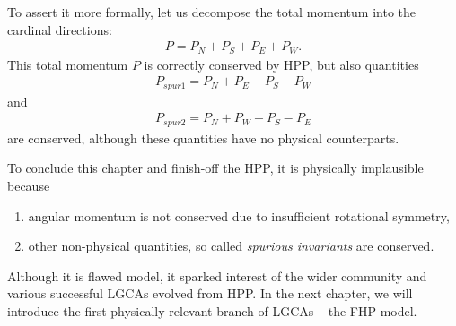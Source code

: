 To assert it more formally, let us decompose the total momentum into the cardinal directions:
\begin{align} 
P = P_N + P_S + P_E + P_W.
\end{align}
This total momentum $P$ is correctly conserved by HPP, but also quantities
\begin{align} \label{zanet}
P_{spur1} = P_N + P_E - P_S - P_W
\end{align}
and
\begin{align}
P_{spur2} = P_N + P_W - P_S - P_E
\end{align}
are conserved, although these quantities have no physical counterparts.

\bigskip

To conclude this chapter and finish-off the HPP, it is physically implausible because
\begin{enumerate}
\item angular momentum is not conserved due to insufficient rotational symmetry,
\item other non-physical quantities, so called \textit{spurious invariants} are conserved.
\end{enumerate}

Although it is flawed model, it sparked interest of the wider community and various successful LGCAs evolved from HPP. In the next chapter, we will introduce the first physically relevant branch of LGCAs -- the FHP model.